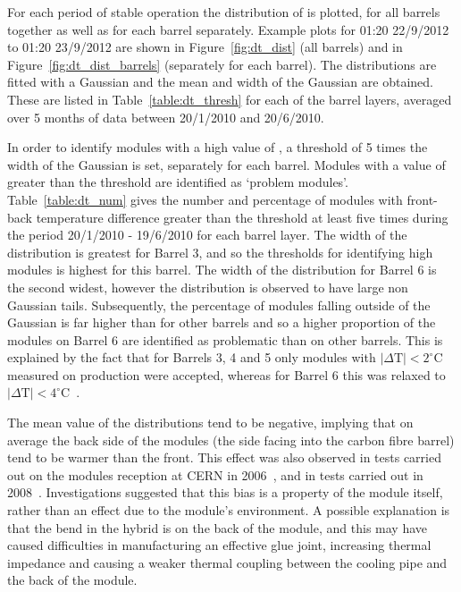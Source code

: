 For each period of stable operation the distribution of \deltat is plotted, for
all barrels together as well as for each barrel separately. Example plots for
01:20 22/9/2012 to 01:20 23/9/2012 are shown in Figure~\ref{fig:dt_dist} (all
barrels) and  in Figure~\ref{fig:dt_dist_barrels} (separately for each barrel).
The distributions are fitted with a Gaussian and the mean and width of the
Gaussian are obtained. These are listed in Table~\ref{table:dt_thresh} for each
of the barrel layers, averaged over 5 months of data between 20/1/2010 and
20/6/2010.  

In order to identify modules with a high value of \deltat, a threshold of 5
times the width of the Gaussian is set, separately for each barrel. Modules with
a value of \deltat greater than the threshold are identified as `problem
modules'. Table~\ref{table:dt_num} gives the number and percentage of modules
with front-back temperature difference greater than the threshold at least five
times during the period 20/1/2010 - 19/6/2010 for each barrel layer. The width
of the distribution is greatest for Barrel 3, and so the thresholds for
identifying high \deltat modules is highest for this barrel. The width of the
distribution for Barrel 6 is the second widest, however the distribution is
observed to have large non Gaussian tails. Subsequently, the percentage of
modules falling outside of the Gaussian is far higher than for other barrels and
so a higher proportion of the modules on Barrel 6 are identified as problematic
than on other barrels. This is explained by the fact that for Barrels 3, 4 and 5
only modules with $|\Delta \mathrm{T}| < 2^\circ$C measured on production were
accepted, whereas for Barrel 6 this was relaxed to $|\Delta \mathrm{T}| <
4^\circ$C~\cite{Viehhauser:2006ix}. 

The mean value of the \deltat distributions tend to be negative, implying that
on average the back side of the modules (the side facing into the carbon fibre
barrel) tend to be warmer than the front. This effect was also observed in tests
carried out on the modules reception at CERN in 2006~\cite{Viehhauser:2006ix},
and in tests carried out in 2008~\cite{Shaw:1229428}. Investigations suggested
that this bias is a property of the module itself, rather than an effect due to
the module's environment. A possible explanation is that the bend in the hybrid
is on the back of the module, and this may have caused difficulties in
manufacturing an  effective glue joint, increasing thermal impedance and causing
a weaker thermal coupling between the cooling pipe and the back of the module.

